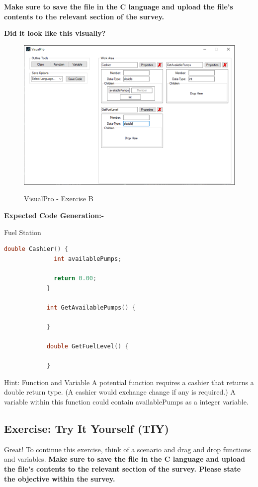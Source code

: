 \documentclass[10pt]{article}
\begin{document}
        \textbf{Make sure to save the file in the C language and upload the file's contents to the relevant section of the survey.}

        \textbf{Did it look like this visually?}
          \begin{figure}[h]
            \centering
            {\includegraphics[scale=0.75]{Figures/Exercises/TutB-SecB-2.png}}
            \caption{VisualPro - Exercise B}
            \label{fig:vp-eB}
          \end{figure}

        \textbf{Expected Code Generation:-}
        \begin{example}{Fuel Station}
          \begin{lstlisting}[language=c]
            double Cashier() {
              int availablePumps;

              return 0.00;
            }

            int GetAvailablePumps() {

            }

            double GetFuelLevel() {

            }
          \end{lstlisting}
        \end{example}

        \begin{tip}{Hint: Function and Variable}
          A potential function requires a cashier that returns a double return type. (A cashier would exchange change if any is required.) A variable within this function could contain availablePumps as a integer variable.
        \end{tip}
    \subsection{Exercise: Try It Yourself (TIY)}
        Great! To continue this exercise, think of a scenario and drag and drop functions and variables.
        \textbf{Make sure to save the file in the C language and upload the file's contents to the relevant section of the survey. Please state the objective within the survey.}
\end{document}
